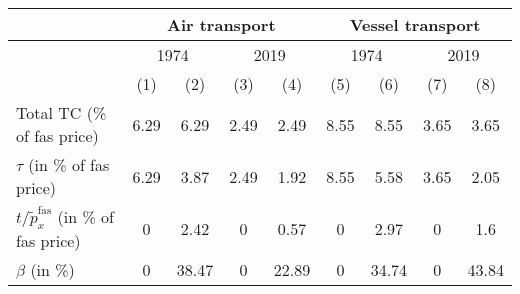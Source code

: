 \begin{tabular}{l|cc|cc||cc|cc}
& \multicolumn{4}{|c||}{Air transport} & \multicolumn{4}{|c}{Vessel transport} \\ \hline
& \multicolumn{2}{|c|}{1974} & \multicolumn{2}{|c||}{2019} & \multicolumn{2}{|c|}{1974} & \multicolumn{2}{|c}{2019}\\
& (1) & (2) &  (3) & (4) & (5) & (6) &  (7) & (8)\\ \hline
Total TC (\% of fas price) & 6.29 & 6.29 & 2.49 & 2.49 & 8.55 & 8.55 & 3.65 & 3.65 \\
$\tau$ (in \% of fas price) & 6.29 & 3.87 & 2.49 & 1.92 & 8.55 & 5.58 & 3.65 & 2.05\\
$t/\widetilde{p}^{\text{fas}}_x$ (in \% of fas price) & 0 & 2.42 & 0 & 0.57 & 0 & 2.97 & 0 & 1.6\\ \hline
$\beta$ (in \%) & 0 & 38.47 & 0 & 22.89 & 0 & 34.74 & 0 & 43.84 \\ 
\hline \hline
\end{tabular} 
